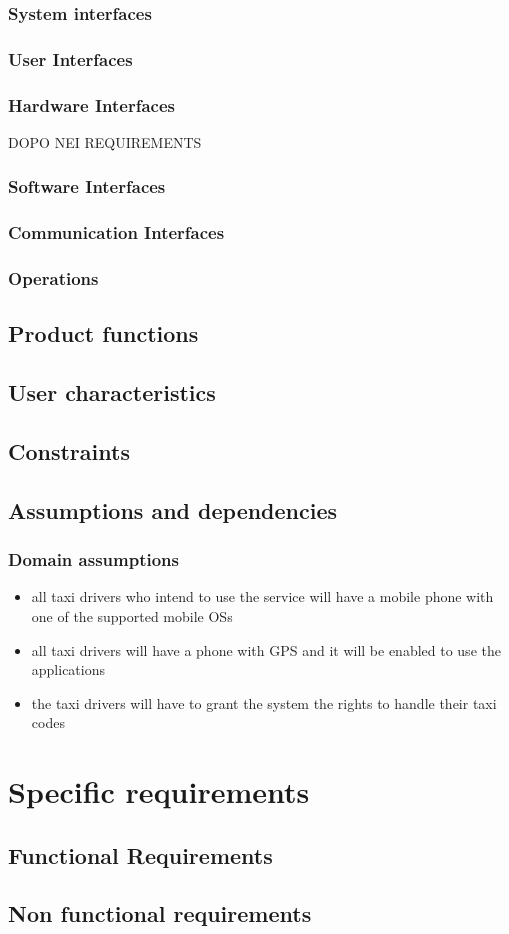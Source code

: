 \documentclass{article}
\begin{document}
	\subsubsection{System interfaces}
	\subsubsection{User Interfaces}
	\subsubsection{Hardware Interfaces}		DOPO NEI REQUIREMENTS
	\subsubsection{Software Interfaces}
	\subsubsection{Communication Interfaces}
	\subsubsection{Operations} 
	\subsection{Product functions}
	\subsection{User characteristics}
	\subsection{Constraints}
	\subsection{Assumptions and dependencies}
	\subsubsection{Domain assumptions}
	\begin{itemize}
		\item all taxi drivers who intend to use the service will have a mobile phone with one of the supported mobile OSs
		\item all taxi drivers will have a phone with GPS and it will be enabled to use the applications
		\item the taxi drivers will have to grant the system the rights to handle their taxi codes
	\end{itemize}
	\section{Specific requirements}
	\subsection{Functional Requirements}
	\subsection{Non functional requirements}
	
\end{document}
